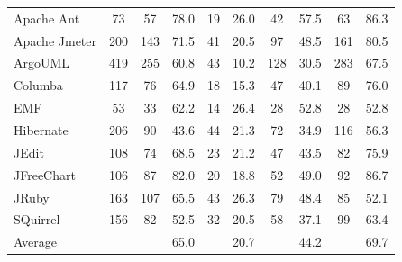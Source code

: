 \begin{table}[h]
\begin{minipage}{\textwidth}
\begin{center}
\begin{tabular}{l| c c c c c c c c c}
        Apache Ant     & 73  & 57   & 78.0  & 19 & 26.0  & 42  & 57.5 & 63  & 86.3   \\
        Apache Jmeter  & 200 & 143  & 71.5  & 41 & 20.5  & 97  & 48.5 & 161 & 80.5   \\
        ArgoUML        & 419 & 255  & 60.8  & 43 & 10.2  & 128 & 30.5 & 283 & 67.5   \\
        Columba        & 117 & 76   & 64.9  & 18 & 15.3  & 47  & 40.1 & 89  & 76.0   \\
        EMF            & 53  & 33   & 62.2  & 14 & 26.4  & 28  & 52.8 & 28  & 52.8   \\
        Hibernate      & 206 & 90   & 43.6  & 44 & 21.3  & 72  & 34.9 & 116 & 56.3   \\
        JEdit          & 108 & 74   & 68.5  & 23 & 21.2  & 47  & 43.5 & 82  & 75.9   \\
        JFreeChart     & 106 & 87   & 82.0  & 20 & 18.8  & 52  & 49.0 & 92  & 86.7   \\
        JRuby          & 163 & 107  & 65.5  & 43 & 26.3  & 79  & 48.4 & 85  & 52.1   \\
        SQuirrel       & 156 & 82   & 52.5  & 32 & 20.5  & 58  & 37.1 & 99  & 63.4   \\
        \midrule
        Average        &     &      & 65.0  &    & 20.7  &     & 44.2 &     & 69.7  \\

        \bottomrule
        \end{tabular}
    \end{center}
  \end{minipage}    
\end{table} 

